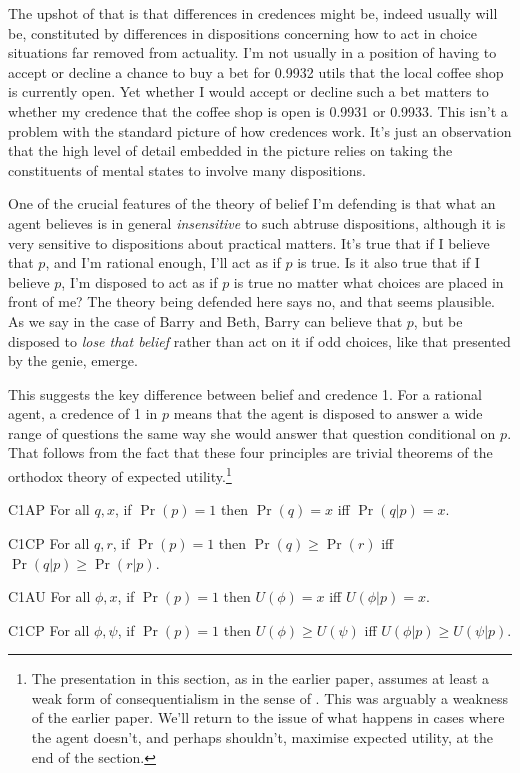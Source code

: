 The upshot of that is that differences in credences might be, indeed usually will be, constituted by differences in dispositions concerning how to act in choice situations far removed from actuality. I'm not usually in a position of having to accept or decline a chance to buy a bet for 0.9932 utils that the local coffee shop is currently open. Yet whether I would accept or decline such a bet matters to whether my credence that the coffee shop is open is 0.9931 or 0.9933. This isn't a problem with the standard picture of how credences work. It's just an observation that the high level of detail embedded in the picture relies on taking the constituents of mental states to involve many dispositions.

One of the crucial features of the theory of belief I'm defending is that what an agent believes is in general \textit{insensitive} to such abtruse dispositions, although it is very sensitive to dispositions about practical matters. It's true that if I believe that $p$, and I'm rational enough, I'll act as if $p$ is true. Is it also true that if I believe $p$, I'm disposed to act as if $p$ is true no matter what choices are placed in front of me? The theory being defended here says no, and that seems plausible. As we say in the case of Barry and Beth, Barry can believe that $p$, but be disposed to \textit{lose that belief} rather than act on it if odd choices, like that presented by the genie, emerge.

This suggests the key difference between belief and credence 1. For a rational agent, a credence of 1 in $p$ means that the agent is disposed to answer a wide range of questions the same way she would answer that question conditional on $p$. That follows from the fact that these four principles are trivial theorems of the orthodox theory of expected utility.\footnote{The presentation in this section, as in the earlier paper, assumes at least a weak form of consequentialism in the sense of \cite{Hammond1988}. This was arguably a weakness of the earlier paper. We'll return to the issue of what happens in cases where the agent doesn't, and perhaps shouldn't, maximise expected utility, at the end of the section.} 

\begin{description*}
\item[C1AP] For all $q, x$, if $\Pr(p) = 1$ then $\Pr(q) = x$ iff $\Pr(q | p) = x$.
\item[C1CP] For all $q, r$, if $\Pr(p) = 1$ then $\Pr(q) \geq \Pr(r)$ iff $\Pr(q | p) \geq \Pr(r | p)$.
\item[C1AU] For all $\phi, x$, if $\Pr(p) = 1$ then $U(\phi) = x$ iff $U(\phi | p) = x$.
\item[C1CP] For all $\phi, \psi$, if $\Pr(p) = 1$ then $U(\phi) \geq U(\psi)$ iff $U(\phi | p) \geq U(\psi | p)$.
\end{description*}

